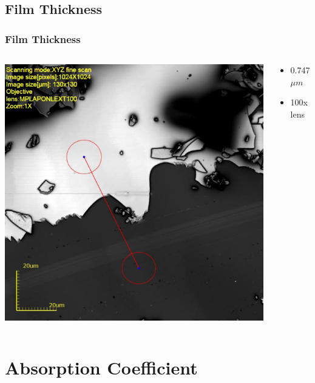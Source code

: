 \documentclass[bigger, english, 10pt, presentation]{beamer}
\begin{document}
\subsection{Film Thickness}
\label{sec-1-2}
\begin{frame}
\frametitle{Film Thickness}
\label{sec-1-2-1}
\begin{columns}
\begin{column}{0.7\textwidth}
\label{sec-1-2-1-1}

\includegraphics[width=.9\linewidth]{./figures/111208_As2S3_AsDeposited_100x_2D_HeightMeasurements.jpeg}
\end{column}
\begin{column}{0.3\textwidth}
\label{sec-1-2-1-2}

\begin{itemize}
\item 0.747 $\mu m$
\item 100x lens
\end{itemize}
\end{column}
\end{columns}
\end{frame}
\section{Absorption Coefficient}
\label{sec-2}
\end{document}
